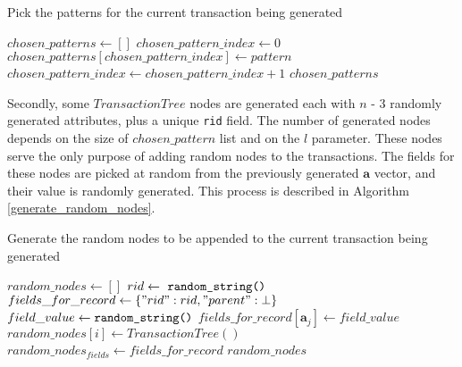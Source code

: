\documentclass{acm_proc_article-sp-sigmod09}
\begin{document}
\begin{algorithm}
\caption{Pick the patterns for the current transaction being generated}
\label{pick_patterns}
\begin{algorithmic}[1]
\State $chosen\_patterns \gets []$
\State $chosen\_pattern\_index \gets 0$
            \State $chosen\_patterns[chosen\_pattern\_index] \gets pattern$
            \State $chosen\_pattern\_index \gets chosen\_pattern\_index + 1$
        \EndIf
    \EndFor
\EndFor
\Return $chosen\_patterns$
\EndFunction
\end{algorithmic}
\end{algorithm}

Secondly, some $TransactionTree$ nodes are generated each with $n$ - 3 randomly generated attributes, plus a unique \texttt{rid} field. The number of generated nodes depends on the size of $chosen\_pattern$ list and on the $l$ parameter. These nodes serve the only purpose of adding random nodes to the transactions. The fields for these nodes are picked at random from the previously generated $\boldsymbol{a}$ vector, and their value is randomly generated. This process is described in Algorithm \ref{generate_random_nodes}.

\begin{algorithm}
\caption{Generate the random nodes to be appended to the current transaction being generated}
\label{generate_random_nodes}
\begin{algorithmic}[1]
\State $random\_nodes \gets []$
    \State $rid \gets \text{ \texttt{random\_string() }}$
    \State $fields\_for\_record \gets \{"rid": rid, "parent": \bot \}$
        \State $field\_value \gets \text{\texttt{random\_string()}}$
        \State $fields\_for\_record[\boldsymbol{a}_j] \gets field\_value$
    \EndFor
    \State $random\_nodes[i] \gets TransactionTree()$
    \State $random\_nodes_{fields} \gets fields\_for\_record$
\EndFor
\Return $random\_nodes$
\EndFunction
\end{algorithmic}
\end{algorithm}
\end{document}
